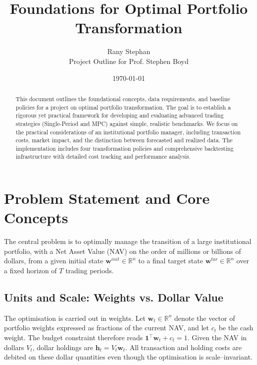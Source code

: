 \documentclass[11pt, letterpaper]{article}
\newcommand{\R}{\mathbb{R}}
\newcommand{\vect}[1]{\boldsymbol{#1}}
\begin{document}
\title{\textbf{Foundations for Optimal Portfolio Transformation}}
\author{Rany Stephan \\ \small{Project Outline for Prof. Stephen Boyd}}
\date{\today}
\maketitle

\begin{abstract}
This document outlines the foundational concepts, data requirements, and baseline policies for a project on optimal portfolio transformation. The goal is to establish a rigorous yet practical framework for developing and evaluating advanced trading strategies (Single-Period and MPC) against simple, realistic benchmarks. We focus on the practical considerations of an institutional portfolio manager, including transaction costs, market impact, and the distinction between forecasted and realized data. The implementation includes four transformation policies and comprehensive backtesting infrastructure with detailed cost tracking and performance analysis.
\end{abstract}

\section{Problem Statement and Core Concepts}

The central problem is to optimally manage the transition of a large institutional portfolio, with a Net Asset Value (NAV) on the order of millions or billions of dollars, from a given initial state $\vect{w}^{init} \in \R^n$ to a final target state $\vect{w}^{tar} \in \R^n$ over a fixed horizon of $T$ trading periods.

\subsection{Units and Scale: Weights vs. Dollar Value}
The optimisation is carried out in 
weights.  Let $\vect{w}_t\in\R^n$ denote the vector of 
portfolio weights expressed as fractions of the current NAV, and let $c_t$ be the
cash weight.  The budget constraint therefore reads $\mathbf{1}^\top\vect{w}_t+c_t=1$.
Given the NAV in dollars $V_t$, dollar holdings are
$\vect{h}_t = V_t\vect{w}_t$.  All transaction and holding
costs are debited on these dollar quantities even though the optimisation is
scale–invariant.
\end{document}
